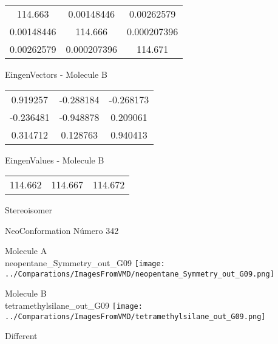 \begin{multicols}{2}
\begin{center}
\begin{tabular}{|c c c|}
114.663	 & 	0.00148446	 & 	0.00262579	 \\
0.00148446	 & 	114.666	 & 	0.000207396	 \\
0.00262579	 & 	0.000207396	 & 	114.671
\end{tabular}

\vtab
 EingenVectors - Molecule B     \\
\vtab
\begin{tabular}{|c c c|}
0.919257	 & 	-0.288184	 & 	-0.268173	 \\
-0.236481	 & 	-0.948878	 & 	0.209061	 \\
0.314712	 & 	0.128763	 & 	0.940413
\end{tabular}

\vtab
 EingenValues - Molecule B     \\
\vtab
\begin{tabular}{|c c c|}
114.662	 & 	114.667	 & 	114.672	 \\
\end{tabular}

\end{center}
\end{multicols}
\begin{center}
\vtab
\vtab
\textcolor{NavyBlue}{\Large Stereoisomer}
\end{center}

 \newpage

\vtab[-2cm]
\begin{center}
{\large NeoConformation \tab Número 342}
\end{center}
\begin{multicols}{2}
\begin{center}
Molecule A \\ 
neopentane\_Symmetry\_out\_G09
\texttt{[image: ../Comparations/ImagesFromVMD/neopentane\_Symmetry\_out\_G09.png]}
\\
\vtab

\columnbreak
Molecule B \\ 
tetramethylsilane\_out\_G09
\texttt{[image: ../Comparations/ImagesFromVMD/tetramethylsilane\_out\_G09.png]}
\\
\vtab


\end{center}
\end{multicols}
\begin{center}
\vtab
\vtab
\textcolor{NavyBlue}{\Large Different}
\end{center}

